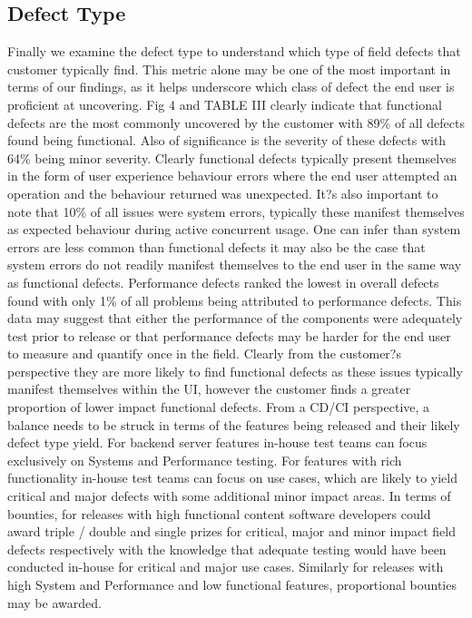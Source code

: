 \documentclass[conference]{IEEEtran}
\begin{document}
\subsection{Defect Type}
Finally we examine the defect type to understand which type of field defects that customer typically find. This metric alone may be one of the most important in terms of our findings, as it helps underscore which class of defect the end user is proficient at uncovering.
Fig 4 and TABLE III clearly indicate that functional defects are the most commonly uncovered by the customer with 89\% of all defects found being functional. Also of significance is the severity of these defects with 64\% being minor severity. Clearly functional defects typically present themselves in the form of user experience behaviour errors where the end user attempted an operation and the behaviour returned was unexpected. It?s also important to note that 10\% of all issues were system errors, typically these manifest themselves as expected behaviour during active concurrent usage. One can infer than system errors are less common than functional defects it may also be the case that system errors do not readily manifest themselves to the end user in the same way as functional defects.
Performance defects ranked the lowest in overall defects found with only 1\% of all problems being attributed to performance defects.  This data may suggest that either the performance of the components were adequately test prior to release or that performance defects may be harder for the end user to measure and quantify once in the field. 
Clearly from the customer?s perspective they are more likely to find functional defects as these issues typically manifest themselves within the UI, however the customer finds a greater proportion of lower impact functional defects. From a CD/CI perspective, a balance needs to be struck in terms of the features being released and their likely defect type yield. For backend server features in-house test teams can focus exclusively on Systems and Performance testing. For features with rich functionality in-house test teams can focus on use cases, which are likely to yield critical and major defects with some additional minor impact areas. 
In terms of bounties, for releases with high functional content software developers could award triple / double and single prizes for critical, major and minor impact field defects respectively with the knowledge that adequate testing would have been conducted in-house for critical and major use cases. Similarly for releases with high System and Performance and low functional features, proportional bounties may be awarded.
\end{document}
